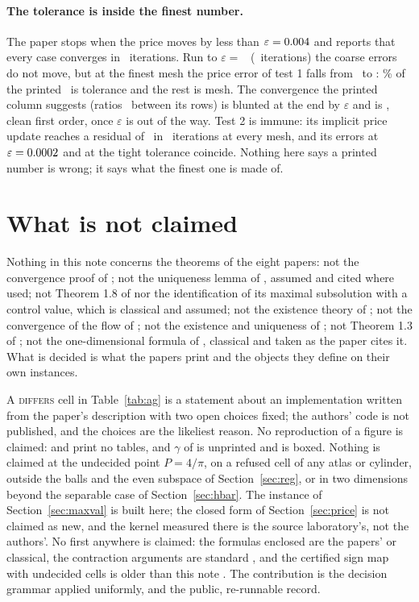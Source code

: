 \documentclass[11pt]{article}
\begin{document}
\paragraph{The tolerance is inside the finest number.} The paper stops when the price moves by less than $\varepsilon = 0.004$ and reports that every case converges in \AGIterTheirs\ iterations. Run to $\varepsilon = $ \AGTight\ (\AGIterTight\ iterations) the coarse errors do not move, but at the finest mesh the price error of test 1 falls from \AGFinestTheirsW\ to \AGFinestTightW: \AGTolShare\% of the printed \AGFinestPrintedW\ is tolerance and the rest is mesh. The convergence the printed column suggests (ratios \AGPrintedRatiosW\ between its rows) is blunted at the end by $\varepsilon$ and is \AGOrdersW, clean first order, once $\varepsilon$ is out of the way. Test 2 is immune: its implicit price update reaches a residual of \AGResidTwo\ in \AGIterTwo\ iterations at every mesh, and its errors at $\varepsilon = 0.0002$ and at the tight tolerance coincide. Nothing here says a printed number is wrong; it says what the finest one is made of.

\section{What is not claimed}\label{sec:notclaimed}

Nothing in this note concerns the theorems of the eight papers: not the convergence proof of \cite{AG25}; not the uniqueness lemma of \cite{AFG17}, assumed and cited where used; not Theorem 1.8 of \cite{GU26} nor the identification of its maximal subsolution with a control value, which is classical and assumed; not the existence theory of \cite{FGU26}; not the convergence of the flow of \cite{BAdHG26}; not the existence and uniqueness of \cite{GS21}; not Theorem 1.3 of \cite{AAG26}; not the one-dimensional formula of \cite{GY20}, classical and taken as the paper cites it. What is decided is what the papers print and the objects they define on their own instances.

A \textsc{differs} cell in Table~\ref{tab:ag} is a statement about an implementation written from the paper's description with two open choices fixed; the authors' code is not published, and the choices are the likeliest reason. No reproduction of a figure is claimed: \cite{AFG17} and \cite{AAG26} print no tables, and $\gamma$ of \cite{AAG26} is unprinted and is boxed. Nothing is claimed at the undecided point $P = 4/\pi$, on a refused cell of any atlas or cylinder, outside the balls and the even subspace of Section~\ref{sec:reg}, or in two dimensions beyond the separable case of Section~\ref{sec:hbar}. The instance of Section~\ref{sec:maxval} is built here; the closed form of Section~\ref{sec:price} is not claimed as new, and the kernel measured there is the source laboratory's, not the authors'. No first anywhere is claimed: the formulas enclosed are the papers' or classical, the contraction arguments are standard \cite{Kr69,vdBL15,DLM07}, and the certified sign map with undecided cells is older than this note \cite{PV04}. The contribution is the decision grammar applied uniformly, and the public, re-runnable record.
\end{document}
